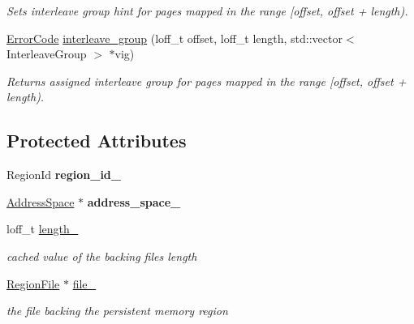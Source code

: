 \begin{DoxyCompactItemize}
\begin{DoxyCompactList}\small\item\em Sets interleave group hint for pages mapped in the range \mbox{[}{\itshape offset}, {\itshape offset} + {\itshape length}). \end{DoxyCompactList}\item 
\hyperlink{group__ERRORCODES_ga6263a3c9a0b8d36aea21cdd835ac99fe}{Error\+Code} \hyperlink{classalps_1_1Region_adf07690fef596f4839404b3651019640}{interleave\+\_\+group} (loff\+\_\+t offset, loff\+\_\+t length, std\+::vector$<$ Interleave\+Group $>$ $\ast$vig)\hypertarget{classalps_1_1Region_adf07690fef596f4839404b3651019640}{}\label{classalps_1_1Region_adf07690fef596f4839404b3651019640}

\begin{DoxyCompactList}\small\item\em Returns assigned interleave group for pages mapped in the range \mbox{[}{\itshape offset}, {\itshape offset} + {\itshape length}). \end{DoxyCompactList}\end{DoxyCompactItemize}
\subsection*{Protected Attributes}
\begin{DoxyCompactItemize}
\item 
Region\+Id {\bfseries region\+\_\+id\+\_\+}\hypertarget{classalps_1_1Region_a0742daaa798c7f500c3cf6ec624a2a1c}{}\label{classalps_1_1Region_a0742daaa798c7f500c3cf6ec624a2a1c}

\item 
\hyperlink{classalps_1_1AddressSpace}{Address\+Space} $\ast$ {\bfseries address\+\_\+space\+\_\+}\hypertarget{classalps_1_1Region_a58a86cf05f9f3f6de58fb05be7a5e0ec}{}\label{classalps_1_1Region_a58a86cf05f9f3f6de58fb05be7a5e0ec}

\item 
loff\+\_\+t \hyperlink{classalps_1_1Region_ac55de996c3c976303cfe396034565f12}{length\+\_\+}\hypertarget{classalps_1_1Region_ac55de996c3c976303cfe396034565f12}{}\label{classalps_1_1Region_ac55de996c3c976303cfe396034565f12}

\begin{DoxyCompactList}\small\item\em cached value of the backing file\textquotesingle{}s length \end{DoxyCompactList}\item 
\hyperlink{classalps_1_1RegionFile}{Region\+File} $\ast$ \hyperlink{classalps_1_1Region_a4212a00156815c7d00b221086e9d30f3}{file\+\_\+}\hypertarget{classalps_1_1Region_a4212a00156815c7d00b221086e9d30f3}{}\label{classalps_1_1Region_a4212a00156815c7d00b221086e9d30f3}

\begin{DoxyCompactList}\small\item\em the file backing the persistent memory region \end{DoxyCompactList}\end{DoxyCompactItemize}


